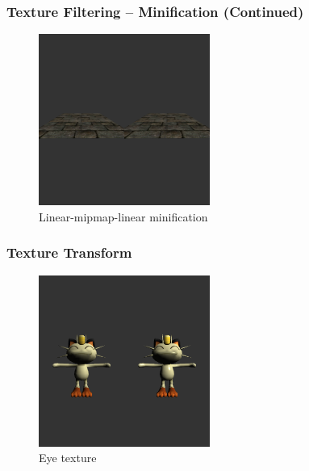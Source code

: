 \documentclass{beamer}
\begin{document}
\begin{frame}
  \frametitle{Texture Filtering -- Minification (Continued)}
  \begin{figure}
    \includegraphics[width=0.5\textwidth]{linear_minification}
    \caption{Linear-mipmap-linear minification}
  \end{figure}
\end{frame}

\begin{frame}
  \frametitle{Texture Transform}
  \begin{figure}
    \includegraphics[width=0.5\textwidth]{eye_texture}
    \caption{Eye texture}
  \end{figure}
\end{frame}
\end{document}
